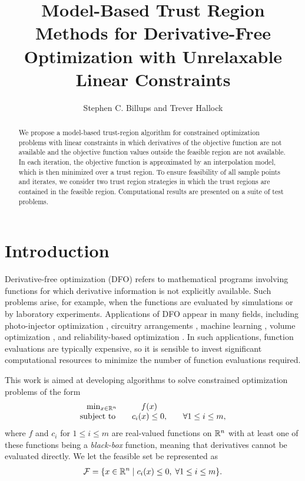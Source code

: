 \documentclass{article}
\title{Model-Based Trust Region Methods for Derivative-Free Optimization with Unrelaxable Linear Constraints}
\author{Stephen C.  Billups and Trever Hallock}
\begin{document}
\maketitle

\begin{abstract}
We propose a model-based trust-region algorithm for constrained optimization problems with linear constraints in which derivatives of the objective function are not available and the objective function values outside the feasible region are not available.
In each iteration, the objective function is approximated by an interpolation model, which is then minimized over a trust region.
To ensure feasibility of all sample points and iterates, we consider two trust region strategies in which the trust regions are contained in the feasible region.
Computational results are presented on a suite of test problems.

\end{abstract}
%
%
%

\section{Introduction}
Derivative-free optimization (DFO) refers to mathematical programs involving functions for which derivative information is not explicitly available.
Such problems arise, for example, when the functions are evaluated by simulations or by laboratory experiments.
Applications of DFO appear in many fields, including photo-injector optimization \cite{Neveu2017},
circuitry arrangements \cite{PLOSKAS201816}, machine learning \cite{KS2018}, volume optimization \cite{Cheng2017}, and reliability-based optimization \cite{Gao2017}.
In such applications, function evaluations are typically expensive, 
so it is sensible to invest significant computational resources to minimize the number of function evaluations required.

This work is aimed at developing algorithms to solve constrained optimization problems of the form 
\begin{align}
\begin{array}{ccl} \min_{x \in \mathbb R^n} & f(x) \\
\mbox{subject to} \quad & c_i(x) \le 0, &\quad \forall 1 \le i \le m,
\end{array}
\label{the_dfo_problem}
\end{align}
where 
$f$ and $c_i$ for $1 \le i \le m$ are real-valued functions on $\mathbb R^n$ with at least one of these functions being a {\em black-box} function, meaning that derivatives cannot be evaluated directly.
We let the feasible set be represented as
\begin{align}
{\mathcal F} = \{x \in \mathbb R^n \; | \; c_i(x) \le 0, \; \forall 1 \le i \le m \}.
\end{align}
\end{document}
